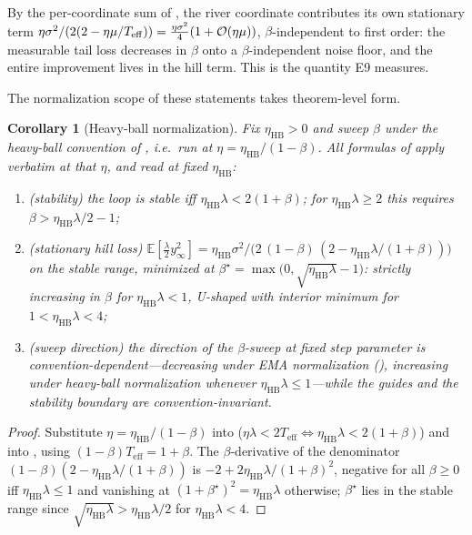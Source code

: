 \documentclass[11pt,a4paper]{article}
\newtheorem{corollary}{Corollary}
\theoremstyle{remark}
\newcommand{\Teff}{T_{\mathrm{eff}}}
\begin{document}
By the per-coordinate sum of , the river coordinate contributes its own stationary term $\eta\sigma^2/(2(2-\eta\mu/\Teff))=\tfrac{\eta\sigma^2}{4}(1+\Ocal(\eta\mu))$, $\beta$-independent to first order: the measurable tail loss decreases in $\beta$ onto a $\beta$-independent noise floor, and the entire improvement lives in the hill term.
This is the quantity E9 measures.

The normalization scope of these statements takes theorem-level form.

\begin{corollary}[Heavy-ball normalization]
\label{cor:hb}
Fix $\eta_{\mathrm{HB}}>0$ and sweep $\beta$ under the heavy-ball convention of , i.e.\ run  at $\eta=\eta_{\mathrm{HB}}/(1-\beta)$.
All formulas of  apply verbatim at that $\eta$, and read at fixed $\eta_{\mathrm{HB}}$:
\begin{enumerate}
\item[(a)] (stability) the loop is stable iff $\eta_{\mathrm{HB}}\lambda<2(1+\beta)$; for $\eta_{\mathrm{HB}}\lambda\ge2$ this requires $\beta>\eta_{\mathrm{HB}}\lambda/2-1$;
\item[(b)] (stationary hill loss) $\mathbb{E}[\tfrac{\lambda}{2}y_\infty^2]=\eta_{\mathrm{HB}}\sigma^2/\bigl(2\,(1-\beta)\,(2-\eta_{\mathrm{HB}}\lambda/(1+\beta))\bigr)$ on the stable range, minimized at $\beta^\star=\max\bigl(0,\sqrt{\eta_{\mathrm{HB}}\lambda}-1\bigr)$: strictly increasing in $\beta$ for $\eta_{\mathrm{HB}}\lambda<1$, U-shaped with interior minimum for $1<\eta_{\mathrm{HB}}\lambda<4$;
\item[(c)] (sweep direction) the direction of the $\beta$-sweep at fixed step parameter is convention-dependent---decreasing under EMA normalization (), increasing under heavy-ball normalization whenever $\eta_{\mathrm{HB}}\lambda\le1$---while the guides and the stability boundary are convention-invariant.
\end{enumerate}
\end{corollary}

\begin{proof}
Substitute $\eta=\eta_{\mathrm{HB}}/(1-\beta)$ into  ($\eta\lambda<2\Teff\Leftrightarrow\eta_{\mathrm{HB}}\lambda<2(1+\beta)$) and into , using $(1-\beta)\Teff=1+\beta$.
The $\beta$-derivative of the denominator $(1-\beta)(2-\eta_{\mathrm{HB}}\lambda/(1+\beta))$ is $-2+2\eta_{\mathrm{HB}}\lambda/(1+\beta)^2$, negative for all $\beta\ge0$ iff $\eta_{\mathrm{HB}}\lambda\le1$ and vanishing at $(1+\beta^\star)^2=\eta_{\mathrm{HB}}\lambda$ otherwise; $\beta^\star$ lies in the stable range since $\sqrt{\eta_{\mathrm{HB}}\lambda}>\eta_{\mathrm{HB}}\lambda/2$ for $\eta_{\mathrm{HB}}\lambda<4$.
\end{proof}
\end{document}
